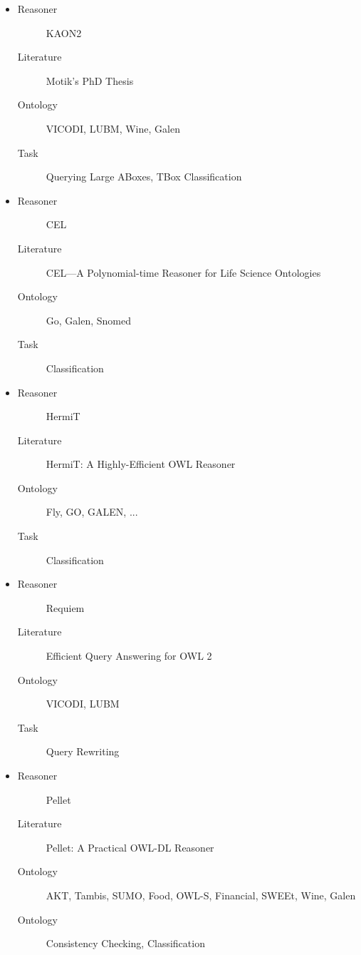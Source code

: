 \documentclass{article}
\begin{document}
\begin{itemize}
\item
  \begin{description}
    \item[Reasoner] KAON2    

    \item[Literature] Motik's PhD Thesis 

    \item[Ontology] VICODI, LUBM, Wine, Galen

    \item[Task] Querying Large ABoxes, TBox Classification
  \end{description}

\item
  \begin{description}
  \item[Reasoner] CEL
  \item[Literature] CEL—A Polynomial-time Reasoner for Life Science
    Ontologies
  \item[Ontology] Go, Galen, Snomed
  \item[Task] Classification
  \end{description}
\item
  \begin{description}
  \item[Reasoner] HermiT
  \item[Literature] HermiT: A Highly-Efficient OWL Reasoner
  \item[Ontology] Fly, GO, GALEN, ...
  \item[Task] Classification
  \end{description}

\item
  \begin{description}
  \item[Reasoner] Requiem
  \item[Literature] Efficient Query Answering for OWL 2
  \item[Ontology] VICODI, LUBM
  \item[Task] Query Rewriting
  \end{description}

\item
  \begin{description}
  \item[Reasoner] Pellet
  \item[Literature] Pellet: A Practical OWL-DL Reasoner
  \item[Ontology] AKT, Tambis, SUMO, Food, OWL-S, Financial, SWEEt,
    Wine, Galen
  \item[Ontology] Consistency Checking, Classification
  \end{description}


\end{itemize}
\end{document}

